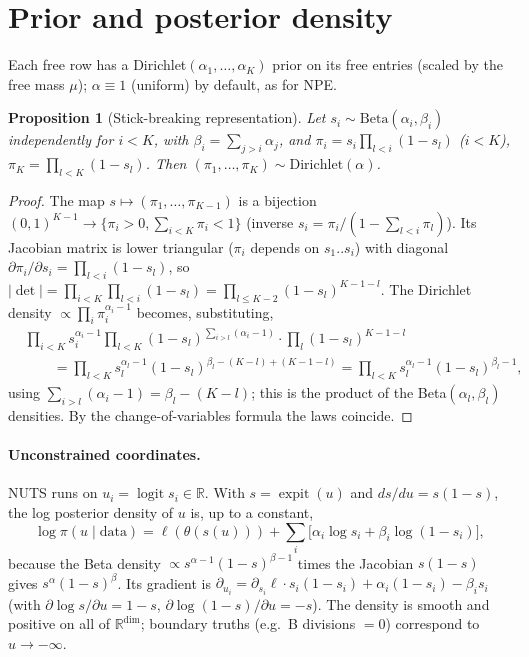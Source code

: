 \documentclass[11pt]{article}
\newtheorem{proposition}[theorem]{Proposition}
\theoremstyle{definition}
\theoremstyle{remark}
\newcommand{\R}{\mathbb{R}}
\DeclareMathOperator{\logit}{logit}
\DeclareMathOperator{\expit}{expit}
\begin{document}
\section{Prior and posterior density}\label{sec:prior}
Each free row has a Dirichlet$(\alpha_1,\dots,\alpha_K)$ prior on its free entries (scaled by the free mass $\mu$); $\alpha\equiv1$ (uniform) by default, as for NPE.
\begin{proposition}[Stick-breaking representation]\label{prop:stick}
Let $s_i\sim\mathrm{Beta}(\alpha_i,\beta_i)$ independently for $i<K$, with $\beta_i=\sum_{j>i}\alpha_j$, and $\pi_i=s_i\prod_{l<i}(1-s_l)$ ($i<K$), $\pi_K=\prod_{l<K}(1-s_l)$. Then $(\pi_1,\dots,\pi_K)\sim\mathrm{Dirichlet}(\alpha)$.
\end{proposition}
\begin{proof}
The map $s\mapsto(\pi_1,\dots,\pi_{K-1})$ is a bijection $(0,1)^{K-1}\to\{\pi_i>0,\sum_{i<K}\pi_i<1\}$ (inverse $s_i=\pi_i/(1-\sum_{l<i}\pi_l)$). Its Jacobian matrix is lower triangular ($\pi_i$ depends on $s_1..s_i$) with diagonal $\partial\pi_i/\partial s_i=\prod_{l<i}(1-s_l)$, so $|\det|=\prod_{i<K}\prod_{l<i}(1-s_l)=\prod_{l\le K-2}(1-s_l)^{K-1-l}$. The Dirichlet density $\propto\prod_i\pi_i^{\alpha_i-1}$ becomes, substituting,
\begin{align*}
&\prod_{i<K}s_i^{\alpha_i-1}\prod_{l<K}(1-s_l)^{\sum_{i>l}(\alpha_i-1)}\cdot\prod_{l}(1-s_l)^{K-1-l}\\
&\qquad=\prod_{l<K}s_l^{\alpha_l-1}(1-s_l)^{\beta_l-(K-l)+(K-1-l)}=\prod_{l<K}s_l^{\alpha_l-1}(1-s_l)^{\beta_l-1},
\end{align*}
using $\sum_{i>l}(\alpha_i-1)=\beta_l-(K-l)$; this is the product of the Beta$(\alpha_l,\beta_l)$ densities. By the change-of-variables formula the laws coincide.
\end{proof}

\paragraph{Unconstrained coordinates.} NUTS runs on $u_i=\logit s_i\in\R$. With $s=\expit(u)$ and $ds/du=s(1-s)$, the log posterior density of $u$ is, up to a constant,
\[
\log\pi(u\mid\text{data})=\ell(\theta(s(u)))+\sum_i\big[\alpha_i\log s_i+\beta_i\log(1-s_i)\big],
\]
because the Beta density $\propto s^{\alpha-1}(1-s)^{\beta-1}$ times the Jacobian $s(1-s)$ gives $s^\alpha(1-s)^\beta$. Its gradient is $\partial_{u_i}=\partial_{s_i}\ell\cdot s_i(1-s_i)+\alpha_i(1-s_i)-\beta_is_i$ (with $\partial\log s/\partial u=1-s$, $\partial\log(1-s)/\partial u=-s$). The density is smooth and positive on all of $\R^{\dim}$; boundary truths (e.g.\ B divisions $=0$) correspond to $u\to-\infty$.
\end{document}
